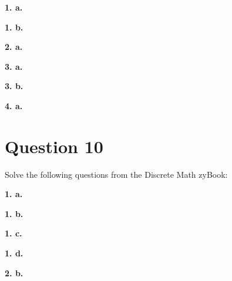 \documentclass[11pt]{article}
\begin{document}
	\textbf{1. a.}
	
	
	\vspace{10mm}
	\textbf{1. b.}
	
	
	\vspace{10mm}
	\textbf{2. a.}
	
	
	\vspace{10mm}
	\textbf{3. a.}
	
	\vspace{10mm}
	\textbf{3. b.}
	
	\vspace{10mm}
	\textbf{4. a.}

	
	\newpage
	\section*{Question 10}
	Solve the following questions from the Discrete Math zyBook:
	
	\textbf{1. a.}

	\vspace{10mm}
	\textbf{1. b.}
	
	\vspace{10mm}
	\textbf{1. c.}
	
	\vspace{10mm}
	\textbf{1. d.}
	
	
	\vspace{10mm}
	\textbf{2. b.}
	
	
\end{document}
